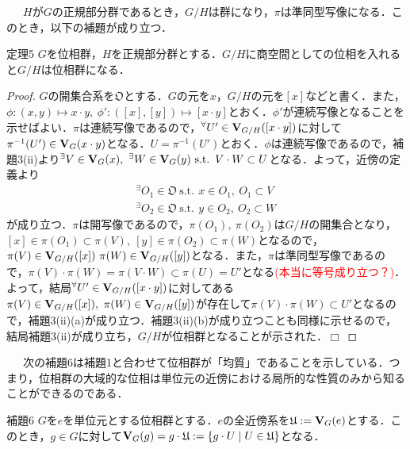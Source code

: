 \documentclass[a4paper,11pt]{jsarticle}
\newtheorem{proof}{証明}
\def\qed{\hfill $\Box$}
\newcommand{\st}{\mathrm{s.t.}\,}  %
\begin{document}
{\ }{\ }{\ }$H$が$G$の正規部分群であるとき，$G/H$は群になり，$\pi$は準同型写像になる．このとき，以下の補題が成り立つ．
%
%
%
\begin{itembox}[l]{定理5}
$G$を位相群，$H$を正規部分群とする．$G/H$に商空間としての位相を入れると$G/H$は位相群になる．
\end{itembox}
\vspace{-1zh}%
\vspace{-1zh}%
\begin{proof}
$G$の開集合系を$\mathfrak{O}$とする．$G$の元を$x$，$G/H$の元を$[x]$などと書く．また，$\phi:(x,y)\mapsto x\cdot y,{\ }\phi':([x],[y])\mapsto [x\cdot y]$とおく．$\phi'$が連続写像となることを示せばよい．$\pi$は連続写像であるので，$^\forall U'\in {\bf V}_{G/H}([x\cdot y])$に対して$\pi^{-1}(U')\in {\bf V}_G(x\cdot y)$となる．$U=\pi^{-1}(U')$とおく．$\phi$は連続写像であるので，補題3(ii)より$^\exists V\in{\bf V}_G(x),{\ } ^\exists W\in{\bf V}_G(y){\ }\st{\ }V\cdot W\subset U$となる．よって，近傍の定義より
\begin{eqnarray*}
^\exists O_1\in\mathfrak{O}{\ }\st{\ }x\in O_1,{\ }O_1\subset V \\
^\exists O_2\in\mathfrak{O}{\ }\st{\ }y\in O_2,{\ }O_2\subset W
\end{eqnarray*}
が成り立つ．$\pi$は開写像であるので，$\pi(O_1),{\ }\pi(O_2)$は$G/H$の開集合となり，$[x]\in \pi(O_1)\subset \pi(V),{\ }[y]\in \pi(O_2)\subset \pi(W)$となるので，$\pi(V)\in{\bf V}_{G/H}([x]){\ }\pi(W)\in{\bf V}_{G/H}([y])$となる．また，$\pi$は準同型写像であるので，$\pi(V)\cdot\pi(W)=\pi(V\cdot W)\subset \pi(U)=U'$となる\textcolor{red}{(本当に等号成り立つ？)}．よって，結局$^\forall U'\in {\bf V}_{G/H}([x\cdot y])$に対してある$\pi(V)\in{\bf V}_{G/H}([x]),{\ }\pi(W)\in{\bf V}_{G/H}([y])$が存在して$\pi(V)\cdot\pi(W)\subset U'$となるので，補題3(ii)(a)が成り立つ．補題3(ii)(b)が成り立つことも同様に示せるので，結局補題3(ii)が成り立ち，$G/H$が位相群となることが示された．\qed
\end{proof}
%
%
%
{\ }{\ }{\ }次の補題6は補題1と合わせて位相群が「均質」であることを示している．つまり，位相群の大域的な位相は単位元の近傍における局所的な性質のみから知ることができるのである．
\begin{itembox}[l]{補題6}
$G$を$e$を単位元とする位相群とする．$e$の全近傍系を$\mathfrak{U}:={\bf V}_G(e)$とする．このとき，$g\in G$に対して${\bf V}_G(g)=g\cdot\mathfrak{U}:=\{g\cdot U \mid U\in \mathfrak{U}\}$となる．
\end{itembox}
\vspace{-1zh}%
\vspace{-1zh}%
\end{document}
